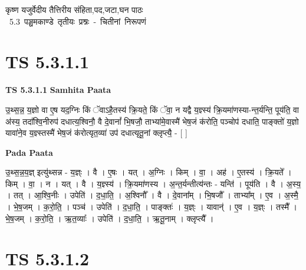 \documentclass[17pt]{extarticle}
\begin{document}
\begin{titlepage}
    \begin{center}
 
\begin{sanskrit}
    { \Huge
    कृष्ण यजुर्वेदीय तैत्तिरीय संहिता,पद,जटा,घन पाठः 
    }
    \\
    \vspace{2.5cm}
    \mbox{ \Huge
    5.3      पञ्चमकाण्डे तृतीयः प्रश्नः - चितीनां निरूपणं   }
\end{sanskrit}
\end{center}

\end{titlepage}
\tableofcontents
\pagebreak

\section*{ TS 5.3.1.1 }

\textbf{TS 5.3.1.1 } \newline
\textbf{Samhita Paata} \newline

उ॒थ्स॒न्न॒ य॒ज्ञो वा ए॒ष यद॒ग्निः किं ॅवाऽहै॒तस्य॑ क्रि॒यते॒ किं ॅवा॒ न यद्वै य॒ज्ञ्स्य॑ क्रि॒यमा॑णस्या-न्त॒र्यन्ति॒ पूय॑ति॒ वा अ॑स्य॒ तदा᳚श्वि॒नीरुप॑ दधात्य॒श्विनौ॒ वै दे॒वानां᳚ भि॒षजौ॒ ताभ्या॑मे॒वास्मै॑ भेष॒जं क॑रोति॒ पञ्चोप॑ दधाति॒ पाङ्क्तो॑ य॒ज्ञो यावा॑ने॒व य॒ज्ञ्स्तस्मै॑ भेष॒जं क॑रोत्यृत॒व्या॑ उप॑ दधात्यृतू॒नां क्लृप्त्यै॒ - [  ] \newline

\textbf{Pada Paata} \newline

उ॒थ्स॒न्न॒य॒ज्ञ् इत्यु॑थ्सन्न - य॒ज्ञ्ः । वै । ए॒षः । यत् । अ॒ग्निः । किम् । वा॒ । अह॑ । ए॒तस्य॑ । क्रि॒यते᳚ । किम् । वा॒ । न । यत् । वै । य॒ज्ञ्स्य॑ । क्रि॒यमा॑णस्य । अ॒न्त॒र्यन्तीत्य॑न्तः - यन्ति॑ । पूय॑ति । वै । अ॒स्य॒ । तत् । आ॒श्वि॒नीः । उपेति॑ । द॒धा॒ति॒ । अ॒श्विनौ᳚ । वै । दे॒वाना᳚म् । भि॒षजौ᳚ । ताभ्या᳚म् । ए॒व । अ॒स्मै॒ । भे॒ष॒जम् । क॒रो॒ति॒ । पञ्च॑ । उपेति॑ । द॒धा॒ति॒ । पाङ्क्तः॑ । य॒ज्ञ्ः । यावान्॑ । ए॒व । य॒ज्ञ्ः । तस्मै᳚ । भे॒ष॒जम् । क॒रो॒ति॒ । ऋ॒त॒व्याः᳚ । उपेति॑ । द॒धा॒ति॒ । ऋ॒तू॒नाम् । क्लृप्त्यै᳚ ।  \newline




\section*{ TS 5.3.1.2 }
\end{document}
